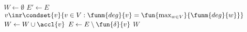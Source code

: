 \State $W\gets\emptyset$
\State $E'\gets E$
\State $v\inr\condset{v}{v\in V:\funm{deg}{v}=\fun{\max_{w\in V}}{\funm{deg}{w}}}$
\State $W\gets W\cup\accl{v}$
\State $E\gets E\setminus\fun{\delta}{v}$
\EndWhile
\State \Return $W$
\EndFunction